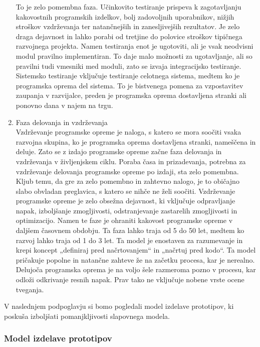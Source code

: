 \documentclass[a4paper,12pt,openright]{book}
\begin{document}
\begin{enumerate}
     To je zelo pomembna faza. Učinkovito testiranje prispeva k zagotavljanju kakovostnih programskih izdelkov, bolj zadovoljnih uporabnikov, nižjih stroškov vzdrževanja ter natančnejših in zanesljivejših rezultatov. Je zelo draga dejavnost in lahko porabi od tretjine do polovice stroškov tipičnega razvojnega projekta.
Namen testiranja enot je ugotoviti, ali je vsak neodvisni modul pravilno implementiran. To daje malo možnosti za ugotavljanje, ali so pravilni tudi vmesniki med moduli, zato se izvaja integracijsko testiranje. Sistemsko testiranje vključuje testiranje celotnega sistema, medtem ko je programska oprema del sistema. To je bistvenega pomena za vzpostavitev zaupanja v razvijalce, preden je programska oprema dostavljena stranki ali ponovno dana v najem na trgu.
    \item Faza delovanja in vzdrževanja \\
    Vzdrževanje programske opreme je naloga, s katero se mora soočiti vsaka razvojna skupina, ko je programska oprema dostavljena stranki, nameščena in deluje. Zato se z izdajo programske opreme začne faza delovanja in vzdrževanja v življenjskem ciklu.
Poraba časa in prizadevanja, potrebna za vzdrževanje delovanja programske opreme po izdaji, sta zelo pomembna. Kljub temu, da gre za zelo pomembno in zahtevno nalogo, je to običajno slabo obvladan preglavica, s katero se nihče ne želi soočiti.
Vzdrževanje programske opreme je zelo obsežna dejavnost, ki vključuje odpravljanje napak, izboljšanje zmogljivosti, odstranjevanje zastarelih zmogljivosti in optimizacijo. Namen te faze je ohraniti kakovost programske opreme v daljšem časovnem obdobju. Ta faza lahko traja od 5 do 50 let, medtem ko razvoj lahko traja od 1 do 3 let.
Ta model je enostaven za razumevanje in krepi koncept „definiraj pred načrtovanjem“ in „načrtuj pred kodo“. Ta model pričakuje popolne in natančne zahteve že na začetku procesa, kar je nerealno. Delujoča programska oprema je na voljo šele razmeroma pozno v procesu, kar odloži odkrivanje resnih napak. Prav tako ne vključuje nobene vrste ocene tveganja.
\cite{aggarwal2005software, alshamrani2015comparison}
\end{enumerate}

V naslednjem podpoglavju si bomo pogledali model izdelave prototipov, ki poskuša izboljšati pomanjkljivosti slapovnega modela.


\pagebreak
\subsubsection{Model izdelave prototipov}
\end{document}

